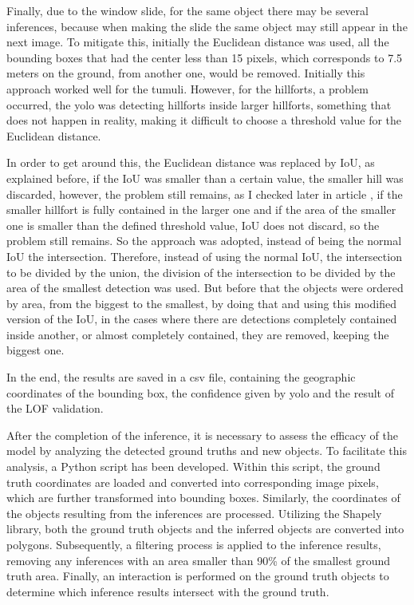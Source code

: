Finally, due to the window slide, for the same object there may be several inferences, because when making the slide the same object may still appear in the next image. To mitigate this, initially the Euclidean distance was used, all the bounding boxes that had the center less than 15 pixels, which corresponds to 7.5 meters on the ground, from another one, would be removed. Initially this approach worked well for the tumuli. However, for the hillforts, a problem occurred, the yolo was detecting hillforts inside larger hillforts, something that does not happen in reality, making it difficult to choose a threshold value for the Euclidean distance. 

In order to get around this, the Euclidean distance was replaced by IoU, as explained before, if the IoU was smaller than a certain value, the smaller hill was discarded, however, the problem still remains, as I checked later in article \cite{Deep Learning for Archaeological Object Detection on LiDAR}, if the smaller hillfort is fully contained in the larger one and if the area of the smaller one is smaller than the defined threshold value, IoU does not discard, so the problem still remains. So the approach was adopted, instead of being the normal IoU the intersection. Therefore, instead of using the normal IoU, the intersection to be divided by the union, the division of the intersection to be divided by the area of the smallest detection was used. But before that the objects were ordered by area, from the biggest to the smallest, by doing that and using this modified version of the IoU, in the cases where there are detections completely contained inside another, or almost completely contained, they are removed, keeping the biggest one.

In the end, the results are saved in a csv file, containing the geographic coordinates of the bounding box, the confidence given by yolo and the result of the LOF validation.

After the completion of the inference, it is necessary to assess the efficacy of the model by analyzing the detected ground truths and new objects. To facilitate this analysis, a Python script has been developed. Within this script, the ground truth coordinates are loaded and converted into corresponding image pixels, which are further transformed into bounding boxes. Similarly, the coordinates of the objects resulting from the inferences are processed. Utilizing the Shapely library, both the ground truth objects and the inferred objects are converted into polygons. Subsequently, a filtering process is applied to the inference results, removing any inferences with an area smaller than 90\% of the smallest ground truth area. Finally, an interaction is performed on the ground truth objects to determine which inference results intersect with the ground truth.

